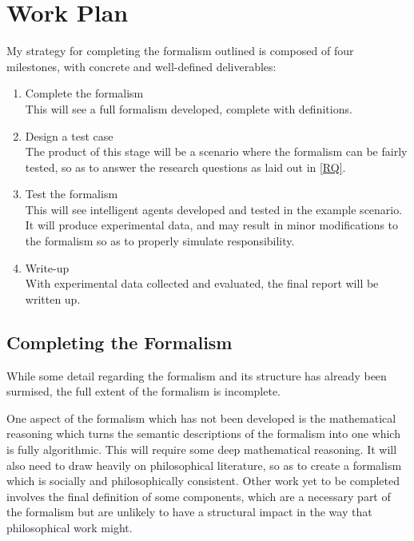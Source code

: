 \section{Work Plan}\label{sec:work_plan}

My strategy for completing the formalism outlined is composed of four milestones, with concrete and well-defined deliverables:
\begin{enumerate}
    \item Complete the formalism\\
    This will see a full formalism developed, complete with definitions.
    \item Design a test case\\
    The product of this stage will be a scenario where the formalism can be fairly tested, so as to answer the research questions as laid out in \cref{RQ}.
    \item Test the formalism\\
    This will see intelligent agents developed and tested in the example scenario. It will produce experimental data, and may result in minor modifications to the formalism so as to properly simulate responsibility.
    \item Write-up\\
    With experimental data collected and evaluated, the final report will be written up.
\end{enumerate}

\subsection{Completing the Formalism}
While some detail regarding the formalism and its structure has already been surmised, the full extent of the formalism is incomplete.\par

One aspect of the formalism which has not been developed is the mathematical reasoning which turns the semantic descriptions of the formalism into one which is fully algorithmic. This will require some deep mathematical reasoning. It will also need to draw heavily on philosophical literature, so as to create a formalism which is socially and philosophically consistent. Other work yet to be completed involves the final definition of some components, which are a necessary part of the formalism but are unlikely to have a structural impact in the way that philosophical work might.\par

